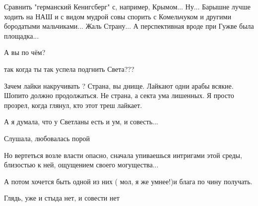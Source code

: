 \begin{itemize}
 

Сравнить "германский Кенигсберг" с, например, Крымом... Ну... Барышне лучше
ходить на НАШ и с видом мудрой совы спорить с Комельчуком и другими бородатыми
мальчиками... Жаль Страну... А перспективная вроде при Гужве была площадка...

 
А вы по чём?

 
так когда ты так успела подгнить Света???

 

Зачем лайки накручивать ? Страна, вы днище. Лайкают одни арабы всякие. Шопито
должно продолжаться. Не страна, а секта ума лишенных. Я просто прозрел, когда
глянул, кто этот треш лайкает.

 

А я думала, что у Светланы есть и ум, и совесть...

Слушала, любовалась порой

Но вертеться возле власти опасно, сначала упиваешься интригами этой среды,
близостью к ней, ощущением своего могущества...

А потом хочется быть одной из них ( мол, я же умнее!)и блага по чину получать.

Глядь, уже и стыда нет, и совести нет


\end{itemize}
